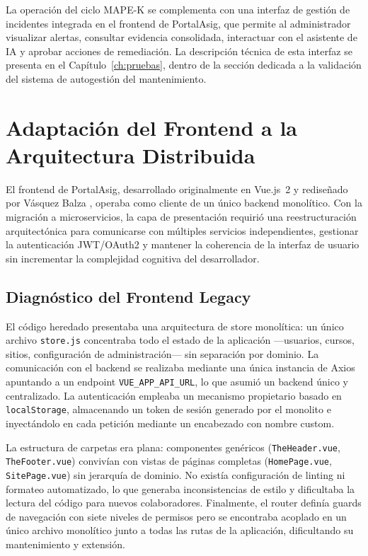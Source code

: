 La operación del ciclo MAPE-K se complementa con una interfaz de gestión de
incidentes integrada en el frontend de PortalAsig, que permite al administrador
visualizar alertas, consultar evidencia consolidada, interactuar con el asistente
de IA y aprobar acciones de remediación. La descripción técnica de esta interfaz
se presenta en el Capítulo~\ref{ch:pruebas}, dentro de la sección dedicada a la
validación del sistema de autogestión del mantenimiento.

\section{Adaptación del Frontend a la Arquitectura Distribuida}
\label{sec:adaptacion-frontend}

El frontend de PortalAsig, desarrollado originalmente en Vue.js~2 y rediseñado
por Vásquez Balza \cite{teg_rafael}, operaba como cliente de un único backend
monolítico. Con la migración a microservicios, la capa de presentación
requirió una reestructuración arquitectónica para comunicarse con múltiples
servicios independientes, gestionar la autenticación JWT/OAuth2 y mantener la
coherencia de la interfaz de usuario sin incrementar la complejidad cognitiva del
desarrollador.

\subsection{Diagnóstico del Frontend Legacy}

El código heredado presentaba una arquitectura de store monolítica: un único
archivo \texttt{store.js} concentraba todo el estado de la aplicación ---usuarios,
cursos, sitios, configuración de administración--- sin separación por dominio.
La comunicación con el backend se realizaba mediante una única instancia de
Axios apuntando a un endpoint \texttt{VUE\_APP\_API\_URL}, lo que asumió un backend
único y centralizado. La autenticación empleaba un mecanismo propietario basado
en \texttt{localStorage}, almacenando un token de sesión generado por el monolito e
inyectándolo en cada petición mediante un encabezado con nombre custom.

La estructura de carpetas era plana: componentes genéricos (\texttt{TheHeader.vue},
\texttt{TheFooter.vue}) convivían con vistas de páginas completas
(\texttt{HomePage.vue}, \texttt{SitePage.vue}) sin jerarquía de dominio. No existía
configuración de linting ni formateo automatizado, lo que generaba inconsistencias
de estilo y dificultaba la lectura del código para nuevos colaboradores.
Finalmente, el router definía guards de navegación con siete niveles de
permisos pero se encontraba acoplado en un único archivo monolítico junto a
todas las rutas de la aplicación, dificultando su mantenimiento y extensión.

